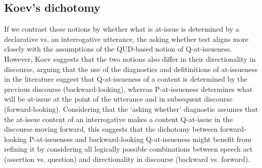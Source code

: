 \documentclass[times,linguex,xcolor]{glossa}
\begin{document}
  \subsection{Koev's dichotomy}
    If we contrast these notions by whether what is at-issue is determined by a declarative vs. an interrogative utterance, the asking whether test aligns more closely with the assumptions of the QUD-based notion of Q-at-issueness. However, Koev suggests that the two notions also differ in their directionality in discourse, arguing that the use of the diagnostics and defitinitions of at-issueness in the literature suggest that Q-at-issueness of a content is determined by the previous discourse (backward-looking), whereas P-at-issueness determines what will be at-issue at the point of the utterance and in subsequent discourse (forward-looking). Considering that the `asking whether' diagnostic assumes that the at-issue content of an interrogative makes a content Q-at-issue in the discourse moving forward, this suggests that the dichotomy between forward-looking P-at-issueness and backward-looking Q-at-issueness might benefit from refining it by considering all logically possible combinations between speech act (assertion vs. question) and directionality in discourse (backward vs. forward).

\nocite{*} %

\end{document}
